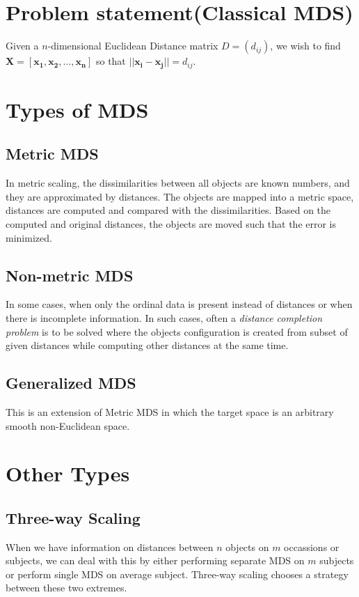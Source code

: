\documentclass[12pt]{article}
\newcommand{\vect}[1]{\boldsymbol{#1}}
\begin{document}
\section*{Problem statement(Classical MDS)}
Given a $n$-dimensional Euclidean Distance matrix $D = (d_{ij})$, we wish to find
$\boldsymbol{X} = [\vect{x_1}, \vect{x_2}, \ldots, \vect{x_n}]$ so that $||\vect{x_i} - \vect{x_j}|| = d_{ij}$.

\section*{Types of MDS}
\subsection*{Metric MDS}
In metric scaling, the dissimilarities between all objects are known numbers,
and they are approximated by distances. The objects are mapped into a metric
space, distances are computed and compared with the dissimilarities. Based on
the computed and original distances, the objects are moved such that the error
is minimized.
\subsection*{Non-metric MDS}
In some cases, when only the ordinal data is present instead of distances or
when there is incomplete information. In such cases, often a \textit{distance completion
problem} is to be solved where the objects configuration is created from subset
of given distances while computing other distances at the same time.
\subsection*{Generalized MDS}
This is an extension of Metric MDS in which the target space is an arbitrary
smooth non-Euclidean space.

\section*{Other Types}
\subsection*{Three-way Scaling}
When we have information on distances between $n$ objects on $m$ occassions or
subjects, we can deal with this by either performing separate MDS on $m$
subjects or perform single MDS on average subject. Three-way scaling chooses a
strategy between these two extremes.
\end{document}
